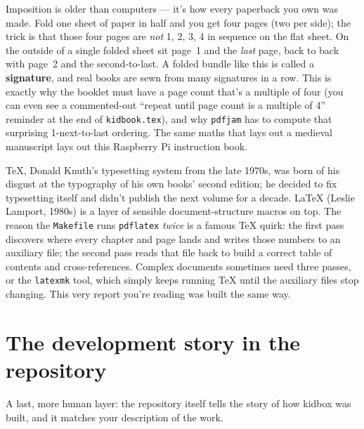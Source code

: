 \documentclass[11pt,oneside]{article}
\newcommand{\file}[1]{\textcolor{kbteal}{\texttt{#1}}}
\begin{document}
\begin{deeper}
Imposition is older than computers --- it's how every paperback you own was made.
Fold one sheet of paper in half and you get four pages (two per side); the trick
is that those four pages are \emph{not} 1, 2, 3, 4 in sequence on the flat sheet.
On the outside of a single folded sheet sit page~1 and the \emph{last} page,
back to back with page~2 and the second-to-last. A folded bundle like this is
called a \textbf{signature}, and real books are sewn from many signatures in a
row. This is exactly why the booklet must have a page count that's a multiple of
four (you can even see a commented-out ``repeat until page count is a multiple of
4'' reminder at the end of \file{kidbook.tex}), and why \texttt{pdfjam} has to
compute that surprising 1-next-to-last ordering. The same maths that lays out a
medieval manuscript lays out this Raspberry Pi instruction book.
\end{deeper}

\begin{deeper}
\TeX{}, Donald Knuth's typesetting system from the late 1970s, was born of his
disgust at the typography of his own books' second edition; he decided to fix
typesetting itself and didn't publish the next volume for a decade. \LaTeX{}
(Leslie Lamport, 1980s) is a layer of sensible document-structure macros on top.
The reason the \texttt{Makefile} runs \texttt{pdflatex} \emph{twice} is a famous
\TeX{} quirk: the first pass discovers where every chapter and page lands and
writes those numbers to an auxiliary file; the second pass reads that file back
to build a correct table of contents and cross-references. Complex documents
sometimes need three passes, or the \texttt{latexmk} tool, which simply keeps
running \TeX{} until the auxiliary files stop changing. This very report you're
reading was built the same way.
\end{deeper}

\section{The development story in the repository}

A last, more human layer: the repository itself tells the story of how kidbox
was built, and it matches your description of the work.
\end{document}
